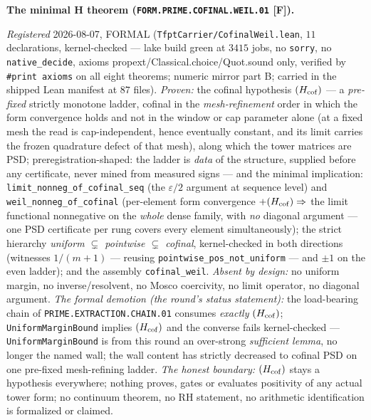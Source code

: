 \par\smallskip\noindent\textbf{The minimal H theorem
(\texttt{FORM.PRIME.\allowbreak COFINAL.\allowbreak WEIL.01}
[F]).}
{\sloppy
\emph{Registered} 2026-08-07, FORMAL
(\texttt{TfptCarrier/CofinalWeil.lean}, $11$ declarations,
kernel-checked --- lake build green at $3415$ jobs, no
\texttt{sorry}, no \texttt{native\_decide}, axioms
propext/Classical.choice/Quot.sound only, verified by
\texttt{\#print axioms} on all eight theorems; numeric mirror
 part B; carried in
the shipped Lean manifest at $87$ files).  \emph{Proven:} the
cofinal hypothesis $(H_{\rm cof})$ --- a \emph{pre-fixed}
strictly monotone ladder, cofinal in the \emph{mesh-refinement}
order in which the form convergence holds and not in the window
or cap parameter alone (at a fixed mesh the read is
cap-independent, hence eventually constant, and its limit
carries the frozen quadrature defect of that mesh), along which
the tower matrices are PSD;
preregistration-shaped: the ladder is \emph{data} of the
structure, supplied before any certificate, never mined from
measured signs --- and the minimal implication:
\texttt{limit\_nonneg\_of\_cofinal\_seq} (the $\varepsilon/2$
argument at sequence level) and
\texttt{weil\_nonneg\_of\_cofinal} (per-element form convergence
$+ (H_{\rm cof}) \Rightarrow$ the limit functional nonnegative
on the \emph{whole} dense family, with \emph{no} diagonal
argument --- one PSD certificate per rung covers every element
simultaneously); the strict hierarchy
\emph{uniform $\subsetneq$ pointwise $\subsetneq$ cofinal},
kernel-checked in both directions (witnesses $1/(m{+}1)$ ---
reusing \texttt{pointwise\_pos\_not\_uniform} --- and $\pm1$ on
the even ladder); and the assembly \texttt{cofinal\_weil}.
\emph{Absent by design:} no uniform margin, no
inverse/resolvent, no Mosco coercivity, no limit operator, no
diagonal argument.  \emph{The formal demotion (the round's
status statement):} the load-bearing chain of
\texttt{PRIME.EXTRACTION.CHAIN.01} consumes \emph{exactly}
$(H_{\rm cof})$; \texttt{UniformMarginBound} implies
$(H_{\rm cof})$ and the converse fails kernel-checked ---
\texttt{UniformMarginBound} is from this round an over-strong
\emph{sufficient lemma}, no longer the named wall; the wall
content has strictly decreased to cofinal PSD on one pre-fixed
mesh-refining ladder.  \emph{The honest boundary:}
$(H_{\rm cof})$ stays a
hypothesis everywhere; nothing proves, gates or evaluates
positivity of any actual tower form; no continuum theorem, no
RH statement, no arithmetic identification is formalized or
claimed.\par}


